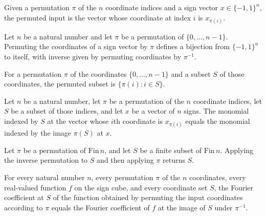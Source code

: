 \begin{definition}
\label{FABL.permuteInput}
\leanok
Given a permutation $\pi$ of the $n$ coordinate indices and a sign vector
$x\in\{-1,1\}^n$, the permuted input is the vector whose coordinate at index $i$ is
$x_{\pi(i)}$.
\end{definition}

\begin{definition}
\label{FABL.permuteInputEquiv}
\leanok
{}
Let $n$ be a natural number and let $\pi$ be a permutation of $\{0,\ldots,n-1\}$.
Permuting the coordinates of a sign vector by $\pi$ defines a bijection from
$\{-1,1\}^n$ to itself, with inverse given by permuting coordinates by $\pi^{-1}$.
\end{definition}

\begin{definition}
\label{FABL.permuteFinset}
\leanok
For a permutation $\pi$ of the coordinates $\{0,\ldots,n-1\}$ and a subset $S$ of those
coordinates, the permuted subset is $\{\pi(i): i\in S\}$.
\end{definition}

\begin{theorem}
\label{FABL.monomial_permuteInput}
\leanok
{}
Let $n$ be a natural number, let $\pi$ be a permutation of the $n$ coordinate indices,
let $S$ be a subset of those indices, and let $x$ be a vector of $n$ signs. The monomial
indexed by $S$ at the vector whose $i$th coordinate is $x_{\pi(i)}$ equals the monomial
indexed by the image $\pi(S)$ at $x$.
\end{theorem}

\begin{theorem}
\label{FABL.permuteFinset_symm}
\leanok
{}
Let $\pi$ be a permutation of $\mathrm{Fin}\,n$, and let $S$ be a finite subset of $\mathrm{Fin}\,n$.
Applying the inverse permutation to $S$ and then applying $\pi$ returns $S$.
\end{theorem}

\begin{theorem}
\label{FABL.fourierCoeff_comp_permuteInput}
\leanok
{}
For every natural number $n$, every permutation $\pi$ of the $n$ coordinates, every
real-valued function $f$ on the sign cube, and every coordinate set $S$, the Fourier
coefficient at $S$ of the function obtained by permuting the input coordinates according
to $\pi$ equals the Fourier coefficient of $f$ at the image of $S$ under $\pi^{-1}$.
\end{theorem}
